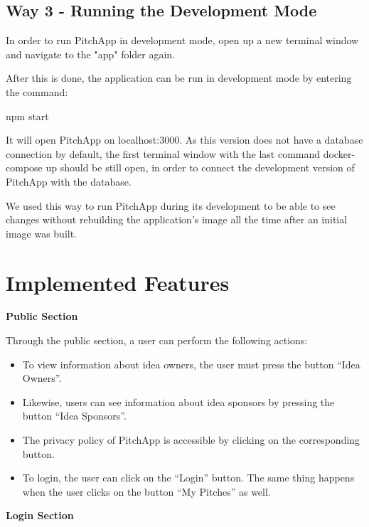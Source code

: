 \subsection{Way 3 - Running the Development Mode}

In order to run PitchApp in development mode, open up a new terminal window and navigate to the "app" folder again.

After this is done, the application can be run in development mode by entering the command:

npm start

It will open PitchApp on localhost:3000. As this version does not have a database connection by default, the first terminal window with the last command docker-compose up should be still open, in order to connect the development version of PitchApp with the database.

We used this way to run PitchApp during its development to be able to see changes without rebuilding the application's image all the time after an initial image was built.

\section{Implemented Features}

\textbf{Public Section}

Through the public section, a user can perform the following actions:

\begin{itemize}

\item To view information about idea owners, the user must press the button “Idea Owners”.
\item Likewise, users can see information about idea sponsors by pressing the button “Idea Sponsors”.
\item The privacy policy of PitchApp is accessible by clicking on the corresponding button.
\item To login, the user can click on the “Login” button. The same thing happens when the user clicks on the button “My Pitches” as well.

\end{itemize}

\textbf{Login Section}

